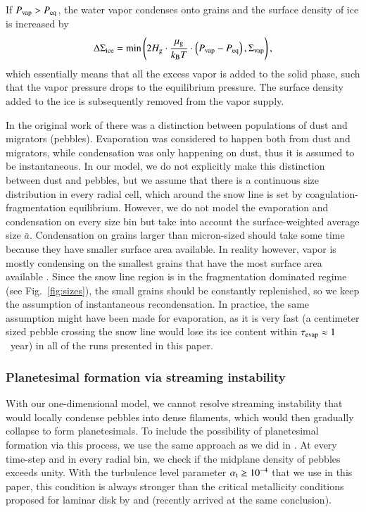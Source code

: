 \documentclass{aa}
\begin{document}
If $P_{\rm vap} > P_{\rm eq}$, the water vapor condenses onto grains and the surface density of ice is increased by
\begin{equation}\label{recon}
\Delta{\Sigma}_{\rm ice} = \min\left(2H_{\rm g}\cdot\frac{\mu_{\rm g}}{k_{\rm B}T}\cdot\left(P_{\rm vap} - P_{\rm eq}\right),\Sigma_{\rm vap}\right),
\end{equation}
which essentially means that all the excess vapor is added to the solid phase, such that the vapor pressure drops to the equilibrium pressure. The surface density added to the ice is subsequently removed from the vapor supply. 

In the original work of \citet{2006Icar..181..178C} there was a distinction between populations of dust and migrators (pebbles). Evaporation was considered to happen both from dust and migrators, while condensation was only happening on dust, thus it is assumed to be instantaneous. In our model, we do not explicitly make this distinction between dust and pebbles, but we assume that there is a continuous size distribution in every radial cell, which around the snow line is set by coagulation-fragmentation equilibrium. However, we do not model the evaporation and condensation on every size bin but take into account the surface-weighted average size $\bar{a}$. Condensation on grains larger than micron-sized should take some time because they have smaller surface area available. In reality however, vapor is mostly condensing on the smallest grains that have the most surface area available \citep[see e.g.][]{2017A&A...600A.140S}. Since the snow line region is in the fragmentation dominated regime (see Fig.~\ref{fig:sizes}), the small grains should be constantly replenished, so we keep the assumption of instantaneous recondensation. In practice, the same assumption might have been made for evaporation, as it is very fast (a centimeter sized pebble crossing the snow line would lose its ice content within $\tau_{\rm{evap}}\approx1$~year) in all of the runs presented in this paper. 

\subsubsection{Planetesimal formation via streaming instability}\label{sub:pfmodel}

With our one-dimensional model, we cannot resolve streaming instability that would locally condense pebbles into dense filaments, which would then gradually collapse to form planetesimals. To include the possibility of planetesimal formation via this process, we use the same approach as we did in \citet{2016A&A...594A.105D}. At every time-step and in every radial bin, we check if the midplane density of pebbles exceeds unity. With the turbulence level parameter $\alpha_{\rm t} \geq 10^{-4}$ that we use in this paper, this condition is always stronger than the critical metallicity conditions proposed for laminar disk by \citet{2014A&A...572A..78D} and \citet{2015A&A...579A..43C} (recently \citet{2017ApJ...839...16C} arrived at the same conclusion). 
\end{document}
